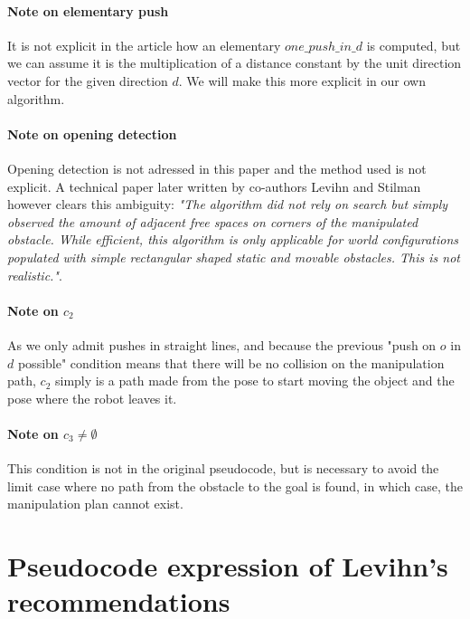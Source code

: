\paragraph{Note on elementary push}\label{push_in_d_note} It is not explicit in the article how an elementary $one\_push\_in\_d$ is computed, but we can assume it is the multiplication of a distance constant by the unit direction vector for the given direction $d$. We will make this more explicit in our own algorithm.

\paragraph{Note on opening detection}\label{opening_detection_note} Opening detection is not adressed in this paper and the method used is not explicit. A technical paper later written by co-authors Levihn and Stilman \parencite{levihn_efficient_2011} however clears this ambiguity: \textit{"The algorithm did not rely on search but simply observed the amount of adjacent free spaces on corners of the manipulated obstacle. While efficient, this algorithm is only applicable for world configurations populated with simple rectangular shaped static and movable obstacles. This is not realistic."}.

\paragraph{Note on $c_{2}$}\label{c2_note} As we only admit pushes in straight lines, and because the previous "push on $o$ in $d$ possible" condition means that there will be no collision on the manipulation path, $c_{2}$ simply is a path made from the pose to start moving the object and the pose where the robot leaves it.

\paragraph{Note on $c_{3} \neq \emptyset$}\label{c3_note} This condition is not in the original pseudocode, but is necessary to avoid the limit case where no path from the obstacle to the goal is found, in which case, the manipulation plan cannot exist.

\section{Pseudocode expression of Levihn's recommendations}

\label{levihn_pseudocode_section}

